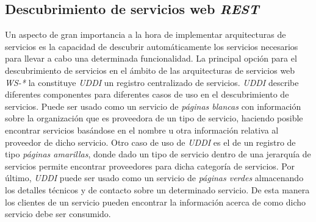 \subsection{Descubrimiento de servicios web \textit{REST}}

Un aspecto de gran importancia a la hora de implementar arquitecturas de servicios es la capacidad de descubrir autom\'aticamente los servicios necesarios para llevar a cabo una determinada funcionalidad. La principal opci\'on para el descubrimiento de servicios en el \'ambito de las arquitecturas de servicios web \textit{WS-*} la constituye \textit{UDDI} un registro centralizado de servicios. \textit{UDDI} describe diferentes componentes para diferentes casos de uso en el descubrimiento de servicios. Puede ser usado como un servicio de \textit{p\'aginas blancas} con informaci\'on sobre la organizaci\'on que es proveedora de un tipo de servicio, haciendo posible encontrar servicios bas\'andose en el nombre u otra informaci\'on relativa al proveedor de dicho servicio. Otro caso de uso de \textit{UDDI} es el de un registro de tipo \textit{p\'aginas amarillas}, donde dado un tipo de servicio dentro de una jerarqu\'ia de servicios permite encontrar proveedores para dicha categor\'ia de servicios. Por \'ultimo, \textit{UDDI} puede ser usado como un servicio de \textit{p\'aginas verdes} almacenando los detalles t\'ecnicos y de contacto sobre un determinado servicio. De esta manera los clientes de un servicio pueden encontrar la informaci\'on acerca de como dicho servicio debe ser consumido.\\

